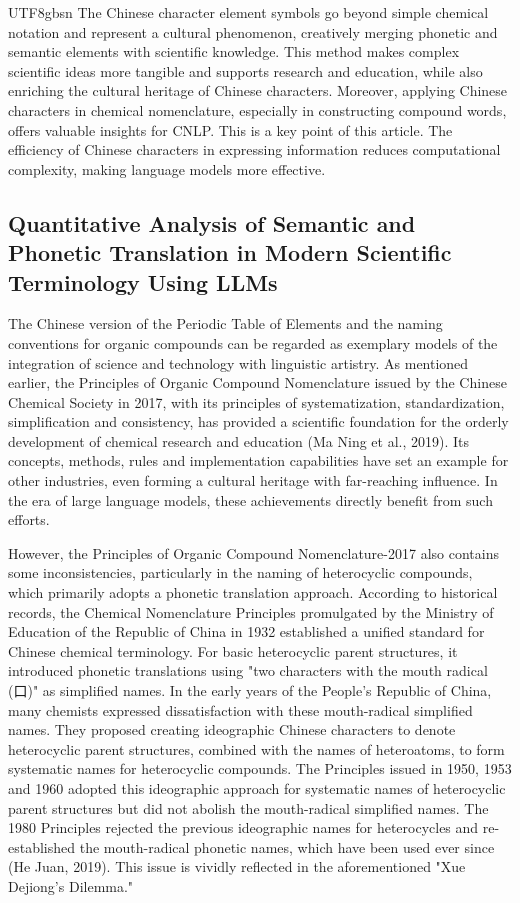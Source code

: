 \documentclass[conference]{IEEEtran}
\begin{document}
\begin{CJK*}{UTF8}{gbsn}
The Chinese character element symbols go beyond simple chemical notation and represent a cultural phenomenon, creatively merging phonetic and semantic elements with scientific knowledge. This method makes complex scientific ideas more tangible and supports research and education, while also enriching the cultural heritage of Chinese characters. Moreover, applying Chinese characters in chemical nomenclature, especially in constructing compound words, offers valuable insights for CNLP. This is a key point of this article. The efficiency of Chinese characters in expressing information reduces computational complexity, making language models more effective. 

\subsection{Quantitative Analysis of Semantic and Phonetic Translation in Modern Scientific Terminology Using LLMs}
The Chinese version of the Periodic Table of Elements and the naming conventions for organic compounds can be regarded as exemplary models of the integration of science and technology with linguistic artistry. As mentioned earlier, the Principles of Organic Compound Nomenclature issued by the Chinese Chemical Society in 2017, with its principles of systematization, standardization, simplification and consistency, has provided a scientific foundation for the orderly development of chemical research and education (Ma Ning et al., 2019). Its concepts, methods, rules and implementation capabilities have set an example for other industries, even forming a cultural heritage with far-reaching influence. In the era of large language models, these achievements directly benefit from such efforts.

However, the Principles of Organic Compound Nomenclature-2017 also contains some inconsistencies, particularly in the naming of heterocyclic compounds, which primarily adopts a phonetic translation approach. According to historical records, the Chemical Nomenclature Principles promulgated by the Ministry of Education of the Republic of China in 1932 established a unified standard for Chinese chemical terminology. For basic heterocyclic parent structures, it introduced phonetic translations using "two characters with the mouth radical (口)" as simplified names. In the early years of the People's Republic of China, many chemists expressed dissatisfaction with these mouth-radical simplified names. They proposed creating ideographic Chinese characters to denote heterocyclic parent structures, combined with the names of heteroatoms, to form systematic names for heterocyclic compounds. The Principles issued in 1950, 1953 and 1960 adopted this ideographic approach for systematic names of heterocyclic parent structures but did not abolish the mouth-radical simplified names. The 1980 Principles rejected the previous ideographic names for heterocycles and re-established the mouth-radical phonetic names, which have been used ever since (He Juan, 2019). This issue is vividly reflected in the aforementioned "Xue Dejiong's Dilemma."


\end{CJK*}
\end{document}
